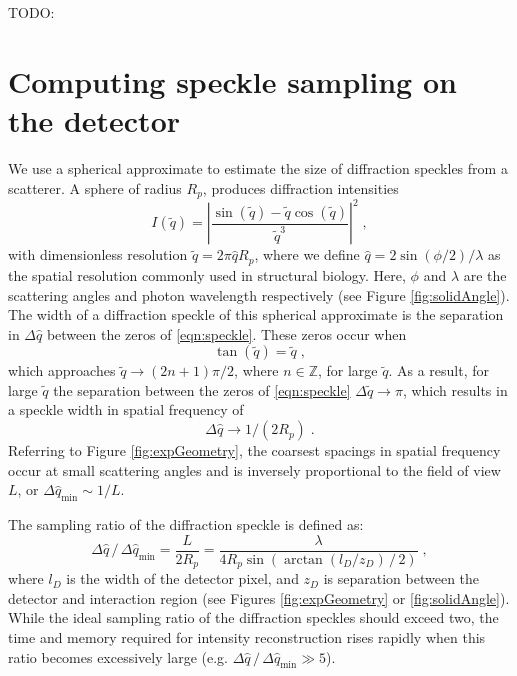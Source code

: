 \documentclass[]{iucr}              %
\begin{document}
TODO:


\appendix

\section{Computing speckle sampling on the detector}\label{sec:speckle}
We use a spherical approximate to estimate the size of diffraction speckles from a scatterer. A sphere of radius $R_p$, produces diffraction intensities 
\begin{equation}
I(\widetilde{q}) = \left|\frac{\sin(\widetilde{q}) - \widetilde{q} \cos(\widetilde{q})} {\widetilde{q}^3} \right|^2 \;, \label{eqn:speckle}
\end{equation}
with dimensionless resolution $\widetilde{q} = 2 \pi \widehat{q} R_p$, where we define $\widehat{q} = 2 \sin(\phi/2) / \lambda$ as the spatial resolution commonly used in structural biology. Here, $\phi$ and $\lambda$ are the scattering angles and photon wavelength respectively (see Figure \ref{fig:solidAngle}). The width of a diffraction speckle of this spherical approximate is the separation in $\Delta \widehat{q} $ between the zeros of \eqref{eqn:speckle}. These zeros occur when 
\begin{equation}
\tan(\widetilde{q}) = \widetilde{q} \;,
\end{equation}
which approaches $\widetilde{q} \to (2n+1) \pi / 2$, where $n \in \mathbb{Z}$, for large $\widetilde{q}$. As a result, for large $\widetilde{q}$ the separation between the zeros of \eqref{eqn:speckle} $\Delta \widetilde{q} \to \pi$, which results in a speckle width in spatial frequency of 
\begin{equation}
\Delta \widehat{q} \to 1/(2 R_p) \;. 
\end{equation}
Referring to Figure \ref{fig:expGeometry}, the coarsest spacings in spatial frequency occur at small scattering angles and is inversely proportional to the field of view $L$, or $\Delta \widehat{q}_{\text{min}} \sim 1/L$. 

The sampling ratio of the diffraction speckle is defined as:
\begin{equation}
\Delta \widehat{q} \,/\, \Delta \widehat{q}_{\text{min}} = \frac{L}{2R_p} = \frac{\lambda}{4 R_p \sin\left( \arctan (l_D / z_D) \,/\,2 \right)}\; ,
\end{equation}
where $l_D$ is the width of the detector pixel, and $z_D$ is separation between the detector and interaction region (see Figures \ref{fig:expGeometry} or \ref{fig:solidAngle}). While the ideal sampling ratio of the diffraction speckles should exceed two, the time and memory required for intensity reconstruction rises rapidly when this ratio becomes excessively large (e.g. $ \Delta \widehat{q} \,/\, \Delta \widehat{q}_{\text{min}} \gg 5$). 
\end{document}
